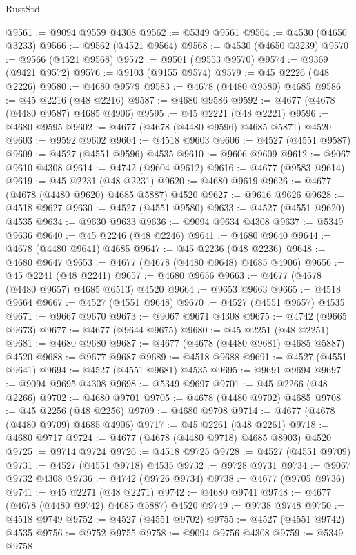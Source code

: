 \begin{lexlean}{RustStd}
\begin{coremodule}
@9561 := @9094 @9559 @4308
@9562 := @5349 @9561
@9564 := @4530 (@4650 @3233)
@9566 := @9562 (@4521 @9564)
@9568 := @4530 (@4650 @3239)
@9570 := @9566 (@4521 @9568)
@9572 := @9501 (@9553 @9570)
@9574 := @9369 (@9421 @9572)
@9576 := @9103 (@9155 @9574)
@9579 := @45 @2226 (@48 @2226)
@9580 := @4680 @9579
@9583 := @4678 (@4480 @9580) @4685
@9586 := @45 @2216 (@48 @2216)
@9587 := @4680 @9586
@9592 := @4677 (@4678 (@4480 @9587) @4685 @4906)
@9595 := @45 @2221 (@48 @2221)
@9596 := @4680 @9595
@9602 := @4677 (@4678 (@4480 @9596) @4685 @5871) @4520
@9603 := @9592 @9602
@9604 := @4518 @9603
@9606 := @4527 (@4551 @9587)
@9609 := @4527 (@4551 @9596) @4535
@9610 := @9606 @9609
@9612 := @9067 @9610 @4308
@9614 := @4742 (@9604 @9612)
@9616 := @4677 (@9583 @9614)
@9619 := @45 @2231 (@48 @2231)
@9620 := @4680 @9619
@9626 := @4677 (@4678 (@4480 @9620) @4685 @5887) @4520
@9627 := @9616 @9626
@9628 := @4518 @9627
@9630 := @4527 (@4551 @9580)
@9633 := @4527 (@4551 @9620) @4535
@9634 := @9630 @9633
@9636 := @9094 @9634 @4308
@9637 := @5349 @9636
@9640 := @45 @2246 (@48 @2246)
@9641 := @4680 @9640
@9644 := @4678 (@4480 @9641) @4685
@9647 := @45 @2236 (@48 @2236)
@9648 := @4680 @9647
@9653 := @4677 (@4678 (@4480 @9648) @4685 @4906)
@9656 := @45 @2241 (@48 @2241)
@9657 := @4680 @9656
@9663 := @4677 (@4678 (@4480 @9657) @4685 @6513) @4520
@9664 := @9653 @9663
@9665 := @4518 @9664
@9667 := @4527 (@4551 @9648)
@9670 := @4527 (@4551 @9657) @4535
@9671 := @9667 @9670
@9673 := @9067 @9671 @4308
@9675 := @4742 (@9665 @9673)
@9677 := @4677 (@9644 @9675)
@9680 := @45 @2251 (@48 @2251)
@9681 := @4680 @9680
@9687 := @4677 (@4678 (@4480 @9681) @4685 @5887) @4520
@9688 := @9677 @9687
@9689 := @4518 @9688
@9691 := @4527 (@4551 @9641)
@9694 := @4527 (@4551 @9681) @4535
@9695 := @9691 @9694
@9697 := @9094 @9695 @4308
@9698 := @5349 @9697
@9701 := @45 @2266 (@48 @2266)
@9702 := @4680 @9701
@9705 := @4678 (@4480 @9702) @4685
@9708 := @45 @2256 (@48 @2256)
@9709 := @4680 @9708
@9714 := @4677 (@4678 (@4480 @9709) @4685 @4906)
@9717 := @45 @2261 (@48 @2261)
@9718 := @4680 @9717
@9724 := @4677 (@4678 (@4480 @9718) @4685 @8903) @4520
@9725 := @9714 @9724
@9726 := @4518 @9725
@9728 := @4527 (@4551 @9709)
@9731 := @4527 (@4551 @9718) @4535
@9732 := @9728 @9731
@9734 := @9067 @9732 @4308
@9736 := @4742 (@9726 @9734)
@9738 := @4677 (@9705 @9736)
@9741 := @45 @2271 (@48 @2271)
@9742 := @4680 @9741
@9748 := @4677 (@4678 (@4480 @9742) @4685 @5887) @4520
@9749 := @9738 @9748
@9750 := @4518 @9749
@9752 := @4527 (@4551 @9702)
@9755 := @4527 (@4551 @9742) @4535
@9756 := @9752 @9755
@9758 := @9094 @9756 @4308
@9759 := @5349 @9758

\end{coremodule}
\end{lexlean}

